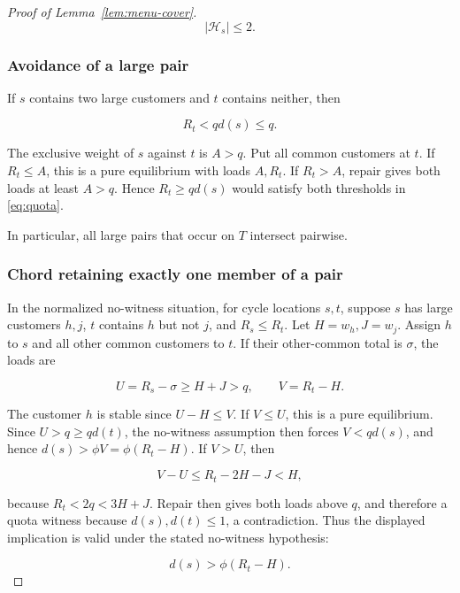 \documentclass[11pt]{amsart}
\numberwithin{equation}{section}
\theoremstyle{definition}
\begin{document}
\begin{proof}[Proof of Lemma~\ref{lem:menu-cover}]
\begin{equation}
|\mathcal H_s|\le2. \label{eq:old-5-1}
\end{equation}


\subsubsection{Avoidance of a large pair}\label{avoidance-of-a-large-pair}

If \(s\) contains two large customers and \(t\) contains neither, then

\begin{equation}
R_t<qd(s)\le q. \label{eq:old-5-2}
\end{equation}

The exclusive weight of \(s\) against \(t\) is \(A>q\). Put all common customers at \(t\). If \(R_t\le A\), this is a pure equilibrium with loads \(A,R_t\). If \(R_t>A\), repair gives both loads at least \(A>q\). Hence \(R_t\ge qd(s)\) would satisfy both thresholds in \eqref{eq:quota}.

In particular, all large pairs that occur on \(T\) intersect pairwise.


\subsubsection{Chord retaining exactly one member of a pair}\label{chord-retaining-exactly-one-member-of-a-pair}

In the normalized no-witness situation, for cycle locations \(s,t\), suppose \(s\) has large customers \(h,j\), \(t\) contains \(h\) but not \(j\), and \(R_s\le R_t\). Let \(H=w_h,J=w_j\). Assign \(h\) to \(s\) and all other common customers to \(t\). If their other-common total is \(\sigma\), the loads are

\[
U=R_s-\sigma\ge H+J>q,\qquad V=R_t-H.
\]

The customer \(h\) is stable since \(U-H\le V\). If \(V\le U\), this is a pure equilibrium. Since \(U>q\ge qd(t)\), the no-witness assumption then forces \(V<qd(s)\), and hence \(d(s)>\phi V=\phi(R_t-H)\). If \(V>U\), then

\[
V-U\le R_t-2H-J<H,
\]

because \(R_t<2q<3H+J\). Repair then gives both loads above \(q\), and therefore a quota witness because \(d(s),d(t)\le1\), a contradiction. Thus the displayed implication is valid under the stated no-witness hypothesis:

\begin{equation}
d(s)>\phi(R_t-H). \label{eq:old-5-3}
\end{equation}


\end{proof}
\end{document}
